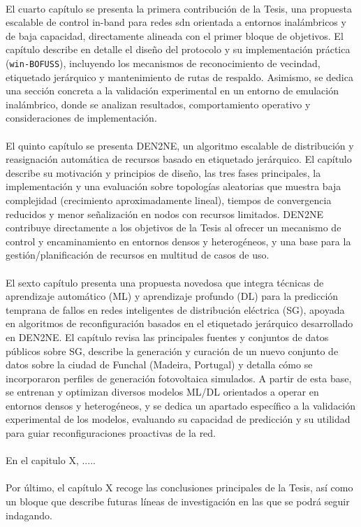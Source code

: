 \\
El cuarto capítulo se presenta la primera contribución de la Tesis, una propuesta escalable de control in-band para redes \gls{sdn} orientada a entornos inalámbricos y de baja capacidad, directamente alineada con el primer bloque de objetivos. El capítulo describe en detalle el diseño del protocolo y su implementación práctica (\texttt{win-BOFUSS}), incluyendo los mecanismos de reconocimiento de vecindad, etiquetado jerárquico y mantenimiento de rutas de respaldo. Asimismo, se dedica una sección concreta a la validación experimental en un entorno de emulación inalámbrico, donde se analizan resultados, comportamiento operativo y consideraciones de implementación.\\
\\
El quinto capítulo se presenta DEN2NE, un algoritmo escalable de distribución y reasignación automática de recursos basado en etiquetado jerárquico. El capítulo describe su motivación y principios de diseño, las tres fases principales, la implementación y una evaluación sobre topologías aleatorias que muestra baja complejidad (crecimiento aproximadamente lineal), tiempos de convergencia reducidos y menor señalización en nodos con recursos limitados. DEN2NE contribuye directamente a los objetivos de la Tesis al ofrecer un mecanismo de control y encaminamiento en entornos densos y heterogéneos, y una base para la gestión/planificación de recursos en multitud de casos de uso.\\
\\
El sexto capítulo presenta una propuesta novedosa que integra técnicas de aprendizaje automático (ML) y aprendizaje profundo (DL) para la predicción temprana de fallos en redes inteligentes de distribución eléctrica (SG), apoyada en algoritmos de reconfiguración basados en el etiquetado jerárquico desarrollado en DEN2NE. El capítulo revisa las principales fuentes y conjuntos de datos públicos sobre SG, describe la generación y curación de un nuevo conjunto de datos sobre la ciudad de Funchal (Madeira, Portugal) y detalla cómo se incorporaron perfiles de generación fotovoltaica simulados. A partir de esta base, se entrenan y optimizan diversos modelos ML/DL orientados a operar en entornos densos y heterogéneos, y se dedica un apartado específico a la validación experimental de los modelos, evaluando su capacidad de predicción y su utilidad para guiar reconfiguraciones proactivas de la red.\\
\\
En el capitulo X, .....\\
\\
Por último, el capítulo X recoge las conclusiones principales de la Tesis, así como un bloque que describe futuras líneas de investigación en las que se podrá seguir indagando.


